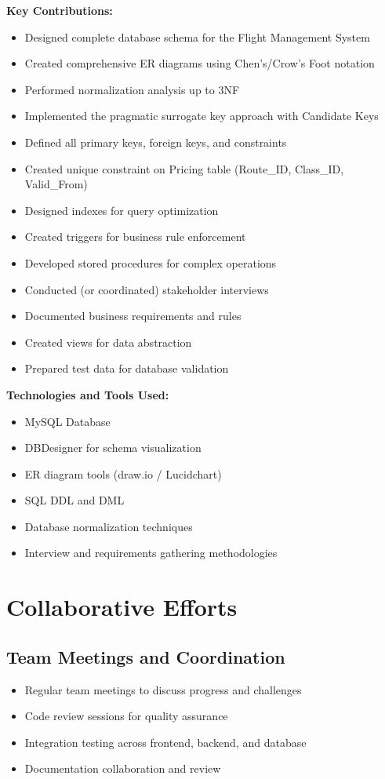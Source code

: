 \documentclass[12pt,a4paper,openany]{report}
\begin{document}
\textbf{Key Contributions:}
\begin{itemize}
    \item Designed complete database schema for the Flight Management System
    \item Created comprehensive ER diagrams using Chen's/Crow's Foot notation
    \item Performed normalization analysis up to 3NF
    \item Implemented the pragmatic surrogate key approach with Candidate Keys
    \item Defined all primary keys, foreign keys, and constraints
    \item Created unique constraint on Pricing table (Route\_ID, Class\_ID, Valid\_From)
    \item Designed indexes for query optimization
\item Created triggers for business rule enforcement
\item Developed stored procedures for complex operations
\item Conducted (or coordinated) stakeholder interviews
\item Documented business requirements and rules
\item Created views for data abstraction
\item Prepared test data for database validation
\end{itemize}
\textbf{Technologies and Tools Used:}
\begin{itemize}
\item MySQL Database
\item DBDesigner for schema visualization
\item ER diagram tools (draw.io / Lucidchart)
\item SQL DDL and DML
\item Database normalization techniques
\item Interview and requirements gathering methodologies
\end{itemize}
\section{Collaborative Efforts}
\subsection{Team Meetings and Coordination}
\begin{itemize}
\item Regular team meetings to discuss progress and challenges
\item Code review sessions for quality assurance
\item Integration testing across frontend, backend, and database
\item Documentation collaboration and review
\end{itemize}
\end{document}

